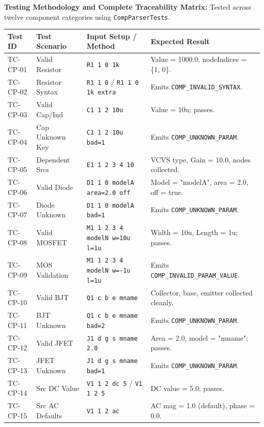 \textbf{Testing Methodology and Complete Traceability Matrix:} Tested across twelve component categories using \texttt{CompParserTests}.
\newpage
\begin{table}[H]
\centering
\small
\begin{tabular}{|l|l|p{4.5cm}|p{4.5cm}|}
\hline
\textbf{Test ID} & \textbf{Test Scenario} & \textbf{Input Setup / Method} & \textbf{Expected Result} \\
\hline
TC-CP-01 & Valid Resistor & \texttt{R1 1 0 1k} & Value = 1000.0, nodeIndices = \{1, 0\}. \\
\hline
TC-CP-02 & Resistor Syntax & \texttt{R1 1 0} / \texttt{R1 1 0 1k extra} & Emits \texttt{COMP\_INVALID\_SYNTAX}. \\
\hline
TC-CP-03 & Valid Cap/Ind & \texttt{C1 1 2 10u} & Value = 10u; passes. \\
\hline
TC-CP-04 & Cap Unknown Key & \texttt{C1 1 2 10u bad=1} & Emits \texttt{COMP\_UNKNOWN\_PARAM}. \\
\hline
TC-CP-05 & Dependent Srcs & \texttt{E1 1 2 3 4 10} & VCVS type, Gain = 10.0, nodes collected. \\
\hline
TC-CP-06 & Valid Diode & \texttt{D1 1 0 modelA area=2.0 off} & Model = "modelA", area = 2.0, off = true. \\
\hline
TC-CP-07 & Diode Unknown & \texttt{D1 1 0 modelA bad=1} & Emits \texttt{COMP\_UNKNOWN\_PARAM}. \\
\hline
TC-CP-08 & Valid MOSFET & \texttt{M1 1 2 3 4 modelN w=10u l=1u} & Width = 10u, Length = 1u; passes. \\
\hline
TC-CP-09 & MOS Validation & \texttt{M1 1 2 3 4 modelN w=-1u l=1u} & Emits \texttt{COMP\_INVALID\_PARAM\_VALUE}. \\
\hline
TC-CP-10 & Valid BJT & \texttt{Q1 c b e mname} & Collector, base, emitter collected cleanly. \\
\hline
TC-CP-11 & BJT Unknown & \texttt{Q1 c b e mname bad=2} & Emits \texttt{COMP\_UNKNOWN\_PARAM}. \\
\hline
TC-CP-12 & Valid JFET & \texttt{J1 d g s mname 2.0} & Area = 2.0, model = "mname"; passes. \\
\hline
TC-CP-13 & JFET Unknown & \texttt{J1 d g s mname bad=1} & Emits \texttt{COMP\_UNKNOWN\_PARAM}. \\
\hline
TC-CP-14 & Src DC Value & \texttt{V1 1 2 dc 5} / \texttt{V1 1 2 5} & DC value = 5.0; passes. \\
\hline
TC-CP-15 & Src AC Defaults & \texttt{V1 1 2 ac} & AC mag = 1.0 (default), phase = 0.0. \\

\end{tabular}
\end{table}
